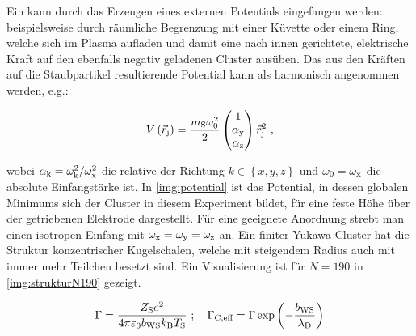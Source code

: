 
         Ein  kann durch das Erzeugen eines externen Potentials eingefangen werden: beispielsweise durch räumliche Begrenzung mit einer Küvette oder einem Ring, welche sich im Plasma aufladen und damit eine nach innen gerichtete, elektrische Kraft auf den ebenfalls negativ geladenen Cluster ausüben. Das aus den Kräften auf die Staubpartikel resultierende Potential kann als harmonisch angenommen werden, e.g.:

           \begin{align}
            V\left(\vec{r}_\text{j}\right)=\frac{m_\text{S}\omega_\text{0}^2}{2}\begin{pmatrix} 1 \\ \alpha_\text{y}  \\ \alpha_\text{z} \end{pmatrix} \vec{r}_\text{j}^2 \,\, ,
           \end{align}

        wobei $\alpha_\text{k}=\omega_\text{k}^2/\omega_\text{x}^2$ die relative der Richtung $k\in\left\lbrace x,y,z\right\rbrace$ und $\omega_\text{0}=\omega_\text{x}$ die absolute Einfangstärke ist. In \autoref{img:potential} ist das Potential, in dessen globalen Minimums sich der Cluster in diesem Experiment bildet, für eine feste Höhe über der getriebenen Elektrode dargestellt. Für eine geeignete Anordnung strebt man einen isotropen Einfang mit $\omega_\text{x}=\omega_\text{y}=\omega_\text{z}$ an. Ein finiter Yukawa-Cluster hat die Struktur konzentrischer Kugelschalen, welche mit steigendem Radius auch mit immer mehr Teilchen besetzt sind. Ein Visualisierung ist für $N=190$ in \autoref{img:strukturN190} gezeigt.

          \begin{align}
            \Gamma=\frac{Z_\text{S}e^2}{4\pi\varepsilon_\text{0}b_\text{WS}k_\text{B}T_\text{S}}  \,\,; \quad \Gamma_\text{C,eff}=\Gamma\exp\left(-\frac{b_\text{WS}}{\lambda_\text{D}}\right) \label{eq:kopplung}
          \end{align}

